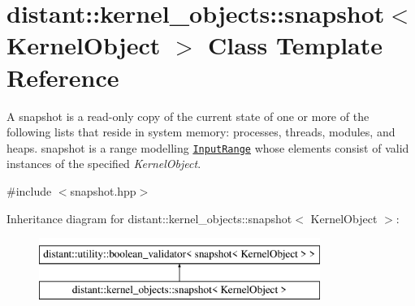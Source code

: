 \hypertarget{classdistant_1_1kernel__objects_1_1snapshot}{}\section{distant\+:\+:kernel\+\_\+objects\+:\+:snapshot$<$ Kernel\+Object $>$ Class Template Reference}
\label{classdistant_1_1kernel__objects_1_1snapshot}


A snapshot is a read-\/only copy of the current state of one or more of the following lists that reside in system memory\+: processes, threads, modules, and heaps. snapshot is a range modelling \href{http://en.cppreference.com/w/cpp/experimental/ranges/range/InputRange}{\tt Input\+Range} whose elements consist of valid instances of the specified {\itshape Kernel\+Object}.  




{\ttfamily \#include $<$snapshot.\+hpp$>$}

Inheritance diagram for distant\+:\+:kernel\+\_\+objects\+:\+:snapshot$<$ Kernel\+Object $>$\+:\begin{figure}[H]
\begin{center}
\leavevmode
\includegraphics[height=2.000000cm]{classdistant_1_1kernel__objects_1_1snapshot}
\end{center}
\end{figure}

